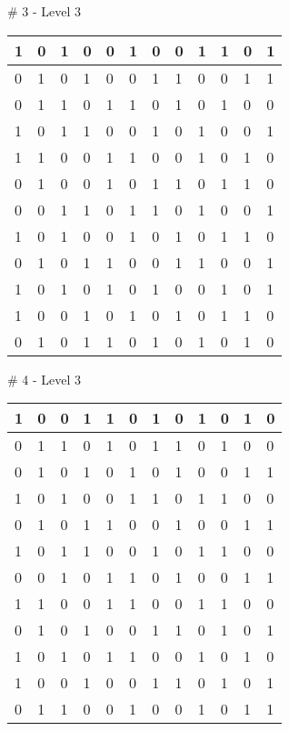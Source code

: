 \# 3 - Level 3 \newline
\begin{tabular}{|m{\collen}|m{\collen}|m{\collen}|m{\collen}|m{\collen}|m{\collen}|m{\collen}|m{\collen}|m{\collen}|m{\collen}|m{\collen}|m{\collen}|}
\hline
  1 & 0 & 1 & 0 & 0 & 1 & 0 & 0 & 1 & 1 & 0 & 1 \\
\hline
  0 & 1 & 0 & 1 & 0 & 0 & 1 & 1 & 0 & 0 & 1 & 1 \\
\hline
  0 & 1 & 1 & 0 & 1 & 1 & 0 & 1 & 0 & 1 & 0 & 0 \\
\hline
  1 & 0 & 1 & 1 & 0 & 0 & 1 & 0 & 1 & 0 & 0 & 1 \\
\hline
  1 & 1 & 0 & 0 & 1 & 1 & 0 & 0 & 1 & 0 & 1 & 0 \\
\hline
  0 & 1 & 0 & 0 & 1 & 0 & 1 & 1 & 0 & 1 & 1 & 0 \\
\hline
  0 & 0 & 1 & 1 & 0 & 1 & 1 & 0 & 1 & 0 & 0 & 1 \\
\hline
  1 & 0 & 1 & 0 & 0 & 1 & 0 & 1 & 0 & 1 & 1 & 0 \\
\hline
  0 & 1 & 0 & 1 & 1 & 0 & 0 & 1 & 1 & 0 & 0 & 1 \\
\hline
  1 & 0 & 1 & 0 & 1 & 0 & 1 & 0 & 0 & 1 & 0 & 1 \\
\hline
  1 & 0 & 0 & 1 & 0 & 1 & 0 & 1 & 0 & 1 & 1 & 0 \\
\hline
  0 & 1 & 0 & 1 & 1 & 0 & 1 & 0 & 1 & 0 & 1 & 0 \\
\hline
\end{tabular}


\smallskip

\# 4 - Level 3 \newline
\begin{tabular}{|m{\collen}|m{\collen}|m{\collen}|m{\collen}|m{\collen}|m{\collen}|m{\collen}|m{\collen}|m{\collen}|m{\collen}|m{\collen}|m{\collen}|}
\hline
  1 & 0 & 0 & 1 & 1 & 0 & 1 & 0 & 1 & 0 & 1 & 0 \\
\hline
  0 & 1 & 1 & 0 & 1 & 0 & 1 & 1 & 0 & 1 & 0 & 0 \\
\hline
  0 & 1 & 0 & 1 & 0 & 1 & 0 & 1 & 0 & 0 & 1 & 1 \\
\hline
  1 & 0 & 1 & 0 & 0 & 1 & 1 & 0 & 1 & 1 & 0 & 0 \\
\hline
  0 & 1 & 0 & 1 & 1 & 0 & 0 & 1 & 0 & 0 & 1 & 1 \\
\hline
  1 & 0 & 1 & 1 & 0 & 0 & 1 & 0 & 1 & 1 & 0 & 0 \\
\hline
  0 & 0 & 1 & 0 & 1 & 1 & 0 & 1 & 0 & 0 & 1 & 1 \\
\hline
  1 & 1 & 0 & 0 & 1 & 1 & 0 & 0 & 1 & 1 & 0 & 0 \\
\hline
  0 & 1 & 0 & 1 & 0 & 0 & 1 & 1 & 0 & 1 & 0 & 1 \\
\hline
  1 & 0 & 1 & 0 & 1 & 1 & 0 & 0 & 1 & 0 & 1 & 0 \\
\hline
  1 & 0 & 0 & 1 & 0 & 0 & 1 & 1 & 0 & 1 & 0 & 1 \\
\hline
  0 & 1 & 1 & 0 & 0 & 1 & 0 & 0 & 1 & 0 & 1 & 1 \\
\hline
\end{tabular}


